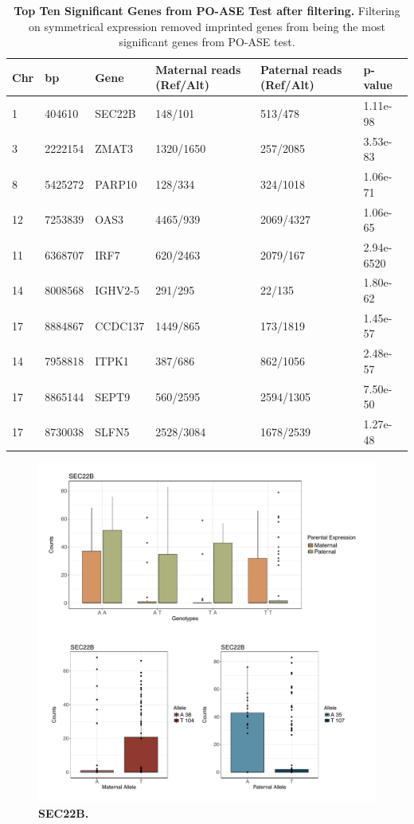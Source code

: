 \begin{table}
\centering
\begin{adjustbox}{width={\textwidth}}
\begin{tabular}{@{}p{3cm}p{3cm}p{3cm}p{3cm}p{3cm}p{3cm}@{}}
 \toprule  Chr & bp & Gene & Maternal reads (Ref/Alt) & Paternal reads (Ref/Alt) & p-value \\ \midrule
1 & 404610 & SEC22B & 148/101 & 513/478 & 1.11e-98 \\
3 & 2222154 & ZMAT3 & 1320/1650 & 257/2085 & 3.53e-83\\
8 & 5425272 & PARP10 & 128/334 & 324/1018 & 1.06e-71 \\
12 & 7253839 & OAS3 & 4465/939 & 2069/4327 & 1.06e-65 \\
11 & 6368707 & IRF7 & 620/2463 & 2079/167 & 2.94e-6520 \\
14 & 8008568 & IGHV2-5 & 291/295 & 22/135 & 1.80e-62 \\
17 & 8884867 & CCDC137 & 1449/865 & 173/1819 & 1.45e-57\\
14 & 7958818 & ITPK1 & 387/686 & 862/1056 & 2.48e-57\\
17 & 8865144 & SEPT9 & 560/2595 & 2594/1305 & 7.50e-50\\
17 & 8730038 & SLFN5 & 2528/3084 & 1678/2539 & 1.27e-48\\  \bottomrule
\end{tabular}
\end{adjustbox}
\caption[Top Ten Significant Genes from PO-ASE Test after filtering.]{\textbf{Top Ten Significant Genes from PO-ASE Test after filtering.} Filtering on symmetrical expression removed imprinted genes from being the most significant genes from PO-ASE test.}
\label{tab:poase2}
\end{table}



\begin{figure}[!htb]
\centering \includegraphics[width=5in]{img/ch04/fig-12-SEC22B.pdf}
\caption[SEC22B.]{\textbf{SEC22B.} }
\label{fig:SEC22B}
\end{figure}


